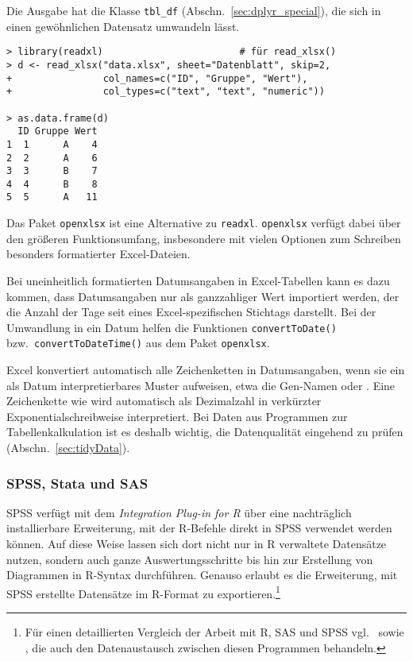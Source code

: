 Die Ausgabe hat die Klasse \lstinline!tbl_df! (Abschn.\ \ref{sec:dplyr_special}), die sich in einen gewöhnlichen Datensatz umwandeln lässt.
\begin{lstlisting}
> library(readxl)                        # für read_xlsx()
> d <- read_xlsx("data.xlsx", sheet="Datenblatt", skip=2,
+                col_names=c("ID", "Gruppe", "Wert"),
+                col_types=c("text", "text", "numeric"))

> as.data.frame(d)
  ID Gruppe Wert
1  1      A    4
2  2      A    6
3  3      B    7
4  4      B    8
5  5      A   11
\end{lstlisting}
  
Das Paket \lstinline!openxlsx! \cite{Walker2015} ist eine Alternative zu \lstinline!readxl!. \lstinline!openxlsx! verfügt dabei über den größeren Funktionsumfang, insbesondere mit vielen Optionen zum Schreiben besonders formatierter Excel-Dateien.

Bei uneinheitlich formatierten Datumsangaben in Excel-Tabellen kann es dazu kommen, dass Datumsangaben nur als ganzzahliger Wert importiert werden, der die Anzahl der Tage seit eines Excel-spezifischen Stichtags darstellt. Bei der Umwandlung in ein Datum helfen die Funktionen \lstinline!convertToDate()! bzw.\ \lstinline!convertToDateTime()! aus dem Paket \lstinline!openxlsx!.

Excel konvertiert automatisch alle Zeichenketten in Datumsangaben, wenn sie ein als Datum interpretierbares Muster aufweisen, etwa die Gen-Namen  oder . Eine Zeichenkette wie  wird automatisch als Dezimalzahl in verkürzter Exponentialschreibweise interpretiert. Bei Daten aus Programmen zur Tabellenkalkulation ist es deshalb wichtig, die Datenqualität eingehend zu prüfen (Abschn.\ \ref{sec:tidyData}).

\subsubsection{SPSS, Stata und SAS}

SPSS verfügt mit dem \emph{Integration Plug-in for R} über eine nachträglich installierbare Erweiterung, mit der R-Befehle direkt in SPSS verwendet werden können. Auf diese Weise lassen sich dort nicht nur in R verwaltete Datensätze nutzen, sondern auch ganze Auswertungsschritte bis hin zur Erstellung von Diagrammen in R-Syntax durchführen. Genauso erlaubt es die Erweiterung, mit SPSS erstellte Datensätze im R-Format zu exportieren.\footnote{Für einen detaillierten Vergleich der Arbeit mit R, SAS und SPSS vgl.\  sowie , die auch den Datenaustausch zwischen diesen Programmen behandeln.}

